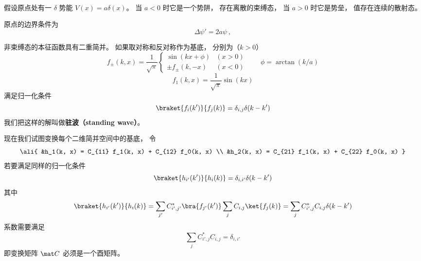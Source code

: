 
\begin{issues}
\issueDraft
\end{issues}


假设原点处有一 $\delta$ 势能 $V(x) = a\delta(x)$。 当 $a < 0$ 时它是一个势阱， 存在离散的束缚态， 当 $a > 0$ 时它是势垒， 值存在连续的散射态。

原点的边界条件为
\begin{equation}
\Delta \psi' = 2a \psi~,
\end{equation}

非束缚态的本征函数具有二重简并。 如果取对称和反对称作为基底， 分别为（$k > 0$）
\begin{equation}
f_\pm(k, x) = \frac{1}{\sqrt{\pi}}
\begin{cases}
\sin(kx + \phi) & (x > 0)\\
\pm f_\pm(k, -x) & (x < 0)
\end{cases}
\qquad  \phi = \arctan(k/a)
\end{equation}
\begin{equation}
f_1(k, x) = \frac{1}{\sqrt{\pi}}\sin(kx)
\end{equation}
满足归一化条件
\begin{equation}\label{eq_Dsc1D_4}
\braket{f_i(k')}{f_j(k)} = \delta_{i,j} \delta(k - k')
\end{equation}
我们把这样的解叫做\textbf{驻波（standing wave）}。

现在我们试图变换每个二维简并空间中的基底， 令
\begin{equation}\ali{
&h_1(k, x) =  C_{11} f_1(k, x) + C_{12} f_0(k, x) \\
&h_2(k, x) =  C_{21} f_1(k, x) + C_{22} f_0(k, x)
}\end{equation}
若要满足同样的归一化条件
\begin{equation}\label{eq_Dsc1D_6}
\braket{h_{i'}(k')}{h_i(k)} = \delta_{i,i'}\delta(k - k')
\end{equation}
其中
\begin{equation}
\braket{h_{i'}(k')}{h_i(k)} = \sum_{j'} C_{i',j'}^* \bra{f_{j'}(k')} \sum_j C_{i, j} \ket{f_j(k)} = \sum_j C_{i', j}^* C_{i, j} \delta(k - k')
\end{equation}
系数需要满足
\begin{equation}
 \sum_j C_{i', j}^* C_{i, j} = \delta_{i, i'}
\end{equation}
即变换矩阵 $\mat C$ 必须是一个酉矩阵。

